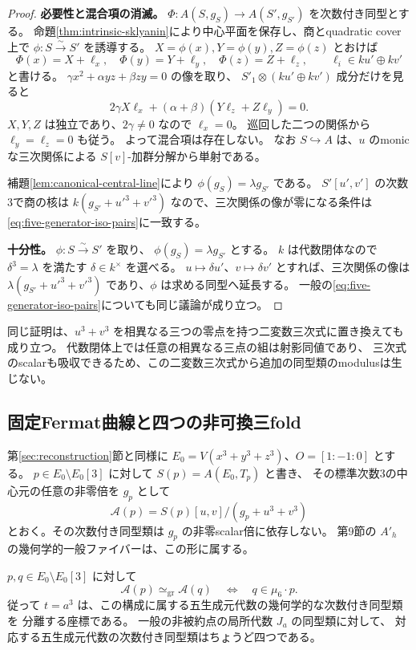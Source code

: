 \begin{proof}
\textbf{必要性と混合項の消滅。}
$\Phi:A(S,g_S)\to A(S',g_{S'})$ を次数付き同型とする。
命題\ref{thm:intrinsic-sklyanin}により中心平面を保存し、商とquadratic cover上で
$\phi:S\xrightarrow{\sim}S'$ を誘導する。
$X=\phi(x),Y=\phi(y),Z=\phi(z)$ とおけば
\[
 \Phi(x)=X+\ell_x,\quad \Phi(y)=Y+\ell_y,\quad
 \Phi(z)=Z+\ell_z,\qquad \ell_i\in ku'\oplus kv'
\]
と書ける。
$\gamma x^2+\alpha yz+\beta zy=0$ の像を取り、
$S'_1\otimes(ku'\oplus kv')$ 成分だけを見ると
\[
 2\gamma X\ell_x+(\alpha+\beta)(Y\ell_z+Z\ell_y)=0.
\]
$X,Y,Z$ は独立であり、$2\gamma\ne0$ なので $\ell_x=0$。
巡回した二つの関係から $\ell_y=\ell_z=0$ も従う。
よって混合項は存在しない。
なお $S\hookrightarrow A$ は、$u$ のmonicな三次関係による
$S[v]$-加群分解から単射である。

補題\ref{lem:canonical-central-line}により $\phi(g_S)=\lambda g_{S'}$ である。
$S'[u',v']$ の次数3で商の核は
$k(g_{S'}+u'^3+v'^3)$ なので、三次関係の像が零になる条件は
\eqref{eq:five-generator-iso-pairs}に一致する。

\textbf{十分性。}
$\phi:S\xrightarrow{\sim}S'$ を取り、
$\phi(g_S)=\lambda g_{S'}$ とする。
$k$ は代数閉体なので $\delta^3=\lambda$ を満たす $\delta\in k^\times$ を選べる。
$u\mapsto\delta u'$、$v\mapsto\delta v'$ とすれば、三次関係の像は
$\lambda(g_{S'}+u'^3+v'^3)$ であり、$\phi$ は求める同型へ延長する。
一般の\eqref{eq:five-generator-iso-pairs}についても同じ議論が成り立つ。
\end{proof}

同じ証明は、$u^3+v^3$ を相異なる三つの零点を持つ二変数三次式に置き換えても成り立つ。
代数閉体上では任意の相異なる三点の組は射影同値であり、
三次式のscalarも吸収できるため、この二変数三次式から追加の同型類のmodulusは生じない。

\subsection{固定Fermat曲線と四つの非可換三fold}

第\ref{sec:reconstruction}節と同様に
$E_0=V(x^3+y^3+z^3)$、$O=[1:-1:0]$ とする。
$p\in E_0\setminus E_0[3]$ に対して $S(p)=A(E_0,T_p)$ と書き、
その標準次数3の中心元の任意の非零倍を $g_p$ として
\[
 \mathcal A(p)=S(p)[u,v]/(g_p+u^3+v^3)
\]
とおく。その次数付き同型類は $g_p$ の非零scalar倍に依存しない。
第9節の $A'_h$ の幾何学的一般ファイバーは、この形に属する。

\begin{theorem}[固定楕円曲線上での完全な次数付き分類]\label{thm:four-five-generator}
$p,q\in E_0\setminus E_0[3]$ に対して
\[
 \mathcal A(p)\simeq_{\mathrm{gr}}\mathcal A(q)
 \quad\Longleftrightarrow\quad q\in\mu_6\cdot p.
\]
従って $t=a^3$ は、この構成に属する五生成元代数の幾何学的な次数付き同型類を
分離する座標である。
一般の非被約点の局所代数 $J_a$ の同型類に対して、
対応する五生成元代数の次数付き同型類はちょうど四つである。
\end{theorem}

